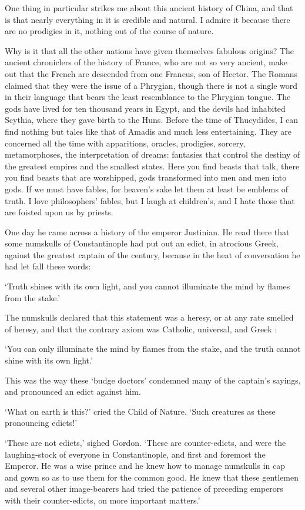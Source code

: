 \documentclass{article}
\begin{document}
\begin{center}
One thing in particular strikes me about this ancient history of China, and that 
is that nearly everything in it is credible and natural. I admire it because there 
are no prodigies in it, nothing out of the course of nature. 

Why is it that all the other nations have given themselves fabulous origins? The 
ancient chroniclers of the history of France, who are not so very ancient, make 
out that the French are descended from one Francus, son of Hector. The Romans claimed 
that they were the issue of a Phrygian, though there is not a single word in their 
language that bears the least resemblance to the Phrygian tongue. The gods have 
lived for ten thousand years in Egypt, and the devils had inhabited Scythia, where 
they gave birth to the Huns. Before the time of Thucydides, I can find nothing 
but tales like that of Amadis and much less entertaining. They are concerned all 
the time with apparitions, oracles, prodigies, sorcery, metamorphoses, the interpretation 
of dreams: fantasies that control the destiny of the greatest empires and the smallest 
states. Here you find beasts that talk, there you find beasts that are worshipped, 
gods transformed into men and men into gods. If we must have fables, for heaven's 
sake let them at least be emblems of truth. I love philosophers' fables, but I 
laugh at children's, and I hate those that are foisted upon us by priests. 

One day he came across a history of the emperor Justinian. He read there that some 
numskulls of Constantinople had put out an edict, in atrocious Greek, against the 
greatest captain of the century, because in the heat of conversation he had let 
fall these words: 

`Truth shines with its own light, and you cannot illuminate the mind by flames 
from the stake.' 

The numskulls declared that this statement was a heresy, or at any rate smelled 
of heresy, and that the contrary axiom was Catholic, universal, and Greek : 

`You can only illuminate the mind by flames from the stake, and the truth cannot 
shine with its own light.' 

This was the way these `budge doctors' condemned many of the captain's sayings, 
and pronounced an edict against him. 

`What on earth is this?' cried the Child of Nature. `Such creatures as these pronouncing 
edicts!' 

`These are not edicts,' sighed Gordon. `These are counter-edicts, and were the 
laughing-stock of everyone in Constantinople, and first and foremost the Emperor. 
He was a wise prince and he knew how to manage numskulls in cap and gown so as 
to use them for the common good. He knew that these gentlemen and several other 
image-bearers had tried the patience of preceding emperors with their counter-edicts, 
on more important matters.' 


\end{center}
\end{document}
